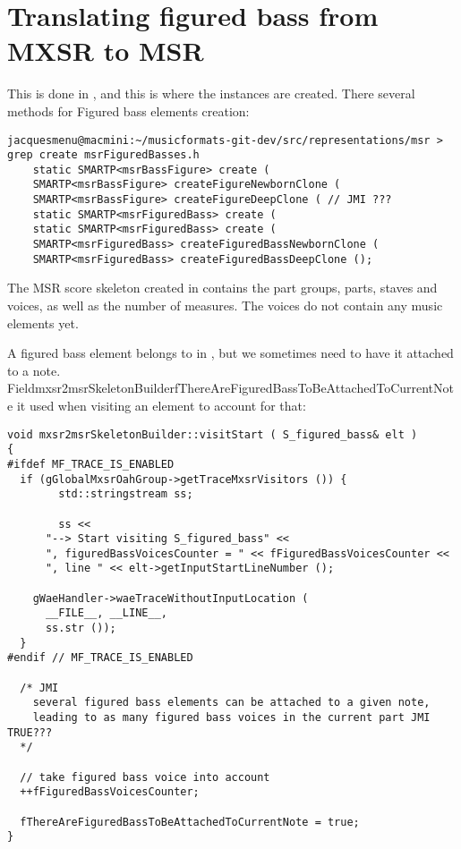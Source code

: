 \section{Translating figured bass from MXSR to MSR}

This is done in \mxsrToMsr{}, and this is where the  instances are created.
There several methods for Figured bass elements creation:%
\begin{lstlisting}[language=Terminal]
jacquesmenu@macmini:~/musicformats-git-dev/src/representations/msr > grep create msrFiguredBasses.h
    static SMARTP<msrBassFigure> create (
    SMARTP<msrBassFigure> createFigureNewbornClone (
    SMARTP<msrBassFigure> createFigureDeepClone ( // JMI ???
    static SMARTP<msrFiguredBass> create (
    static SMARTP<msrFiguredBass> create (
    SMARTP<msrFiguredBass> createFiguredBassNewbornClone (
    SMARTP<msrFiguredBass> createFiguredBassDeepClone ();
\end{lstlisting}

The MSR score skeleton created in  contains the part groups, parts, staves and voices, as well as the number of measures. The voices do not contain any music elements yet.

A figured bass element belongs to  in \mxml, but we sometimes need to have it attached to a note.\\
Field{mxsr2msrSkeletonBuilder}{fThereAreFiguredBassToBeAttachedToCurrentNote} it used when visiting an  element to account for that:%
\begin{lstlisting}[language=CPlusPlus]
void mxsr2msrSkeletonBuilder::visitStart ( S_figured_bass& elt )
{
#ifdef MF_TRACE_IS_ENABLED
  if (gGlobalMxsrOahGroup->getTraceMxsrVisitors ()) {
		std::stringstream ss;

		ss <<
      "--> Start visiting S_figured_bass" <<
      ", figuredBassVoicesCounter = " << fFiguredBassVoicesCounter <<
      ", line " << elt->getInputStartLineNumber ();

    gWaeHandler->waeTraceWithoutInputLocation (
      __FILE__, __LINE__,
      ss.str ());
  }
#endif // MF_TRACE_IS_ENABLED

  /* JMI
    several figured bass elements can be attached to a given note,
    leading to as many figured bass voices in the current part JMI TRUE???
  */

  // take figured bass voice into account
  ++fFiguredBassVoicesCounter;

  fThereAreFiguredBassToBeAttachedToCurrentNote = true;
}
\end{lstlisting}

